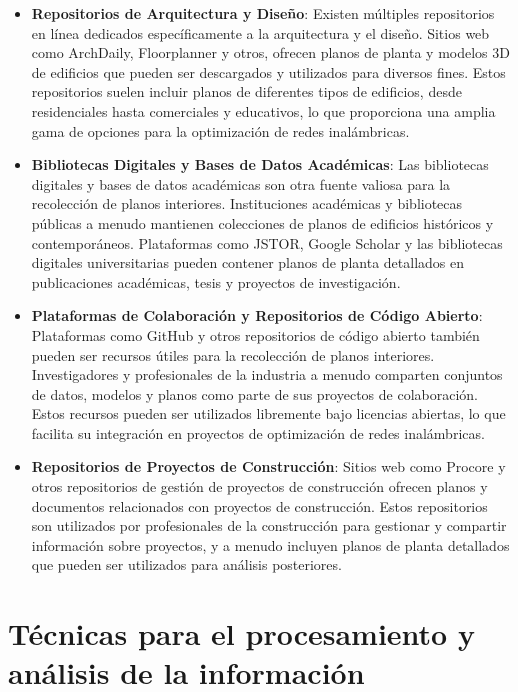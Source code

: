 \begin{itemize}
    \item \textbf{Repositorios de Arquitectura y Diseño}: Existen múltiples repositorios en línea dedicados específicamente a la arquitectura y el diseño. Sitios web como ArchDaily, Floorplanner y otros, ofrecen planos de planta y modelos 3D de edificios que pueden ser descargados y utilizados para diversos fines. Estos repositorios suelen incluir planos de diferentes tipos de edificios, desde residenciales hasta comerciales y educativos, lo que proporciona una amplia gama de opciones para la optimización de redes inalámbricas.
    \item \textbf{Bibliotecas Digitales y Bases de Datos Académicas}: Las bibliotecas digitales y bases de datos académicas son otra fuente valiosa para la recolección de planos interiores. Instituciones académicas y bibliotecas públicas a menudo mantienen colecciones de planos de edificios históricos y contemporáneos. Plataformas como JSTOR, Google Scholar y las bibliotecas digitales universitarias pueden contener planos de planta detallados en publicaciones académicas, tesis y proyectos de investigación.
    \item \textbf{Plataformas de Colaboración y Repositorios de Código Abierto}: Plataformas como GitHub y otros repositorios de código abierto también pueden ser recursos útiles para la recolección de planos interiores. Investigadores y profesionales de la industria a menudo comparten conjuntos de datos, modelos y planos como parte de sus proyectos de colaboración. Estos recursos pueden ser utilizados libremente bajo licencias abiertas, lo que facilita su integración en proyectos de optimización de redes inalámbricas.
    \item \textbf{Repositorios de Proyectos de Construcción}: Sitios web como Procore y otros repositorios de gestión de proyectos de construcción ofrecen planos y documentos relacionados con proyectos de construcción. Estos repositorios son utilizados por profesionales de la construcción para gestionar y compartir información sobre proyectos, y a menudo incluyen planos de planta detallados que pueden ser utilizados para análisis posteriores.
    \end{itemize}



\section{Técnicas para el procesamiento y análisis de la información}

